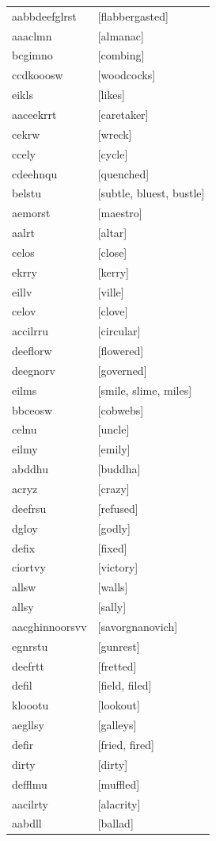 \documentclass{article}
\begin{document}
\begin{tabular}{ll}
aabbdeefglrst & [flabbergasted] \\
aaaclmn & [almanac] \\
bcgimno & [combing] \\
ccdkooosw & [woodcocks] \\
eikls & [likes] \\
aaceekrrt & [caretaker] \\
cekrw & [wreck] \\
ccely & [cycle] \\
cdeehnqu & [quenched] \\
belstu & [subtle, bluest, bustle] \\
aemorst & [maestro] \\
aalrt & [altar] \\
celos & [close] \\
ekrry & [kerry] \\
eillv & [ville] \\
celov & [clove] \\
accilrru & [circular] \\
deeflorw & [flowered] \\
deegnorv & [governed] \\
eilms & [smile, slime, miles] \\
bbceosw & [cobwebs] \\
celnu & [uncle] \\
eilmy & [emily] \\
abddhu & [buddha] \\
acryz & [crazy] \\
deefrsu & [refused] \\
dgloy & [godly] \\
defix & [fixed] \\
ciortvy & [victory] \\
allsw & [walls] \\
allsy & [sally] \\
aacghinnoorsvv & [savorgnanovich] \\
egnrstu & [gunrest] \\
deefrtt & [fretted] \\
defil & [field, filed] \\
kloootu & [lookout] \\
aegllsy & [galleys] \\
defir & [fried, fired] \\
dirty & [dirty] \\
defflmu & [muffled] \\
aacilrty & [alacrity] \\
aabdll & [ballad] \\

\end{tabular}
\end{document}
